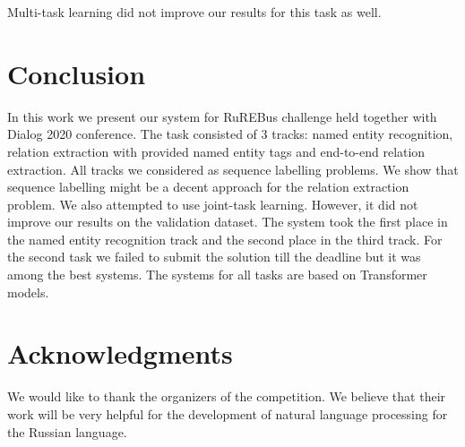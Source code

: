 \documentclass{dialogue}
\begin{document}
	Multi-task learning did not improve our results for this task as well. 
	\section{Conclusion}
	In this work we present our system for RuREBus challenge held together with Dialog 2020 conference. The task consisted of 3 tracks: named entity recognition, relation extraction with provided named entity tags and end-to-end relation extraction. All tracks we considered as sequence labelling problems. We show that sequence labelling might be a decent approach for the relation extraction problem. We also attempted to use joint-task learning. However, it did not improve our results on the validation dataset. The system took the first place in the named entity recognition track and the second place in the third track. For the second task we failed to submit the solution till the deadline but it was among the best systems. The systems for all tasks are based on Transformer models.
	
	\section{Acknowledgments}
	We would like to thank the organizers of the competition. We believe that their work will be very helpful for the development of natural language processing for the Russian language.
	
	
	
\end{document}
